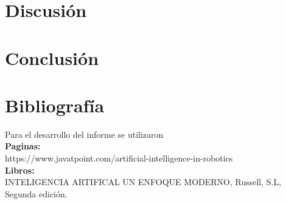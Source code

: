 \documentclass[a4paper]{article}
\begin{document}
 
\pagebreak
\section{Discusi\'on}

\section{Conclusi\'on}

\section{Bibliograf\'ia}

Para el desarrollo del informe se utilizaron\\
\textbf{Paginas:}\\
https://www.javatpoint.com/artificial-intelligence-in-robotics\\ 
\textbf{Libros:}\\
INTELIGENCIA ARTIFICAL UN ENFOQUE MODERNO, Russell, S.L, Segunda edición.
\end{document}
